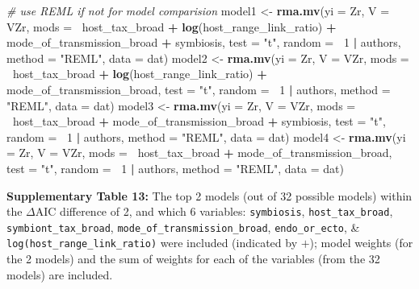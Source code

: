 \documentclass[
]{article}
\newenvironment{Shaded}{\begin{snugshade}}{\end{snugshade}}
\newcommand{\CommentTok}[1]{\textcolor[rgb]{0.56,0.35,0.01}{\textit{#1}}}
\newcommand{\DataTypeTok}[1]{\textcolor[rgb]{0.13,0.29,0.53}{#1}}
\newcommand{\DecValTok}[1]{\textcolor[rgb]{0.00,0.00,0.81}{#1}}
\newcommand{\KeywordTok}[1]{\textcolor[rgb]{0.13,0.29,0.53}{\textbf{#1}}}
\newcommand{\NormalTok}[1]{#1}
\newcommand{\OperatorTok}[1]{\textcolor[rgb]{0.81,0.36,0.00}{\textbf{#1}}}
\newcommand{\StringTok}[1]{\textcolor[rgb]{0.31,0.60,0.02}{#1}}
\begin{document}
\begin{Shaded}
\begin{Highlighting}[]
\CommentTok{# use REML if not for model comparision}
\NormalTok{model1 <-}\StringTok{ }\KeywordTok{rma.mv}\NormalTok{(}\DataTypeTok{yi =}\NormalTok{ Zr, }\DataTypeTok{V =}\NormalTok{ VZr, }\DataTypeTok{mods =} \OperatorTok{~}\NormalTok{host_tax_broad }\OperatorTok{+}\StringTok{ }\KeywordTok{log}\NormalTok{(host_range_link_ratio) }\OperatorTok{+}\StringTok{ }
\StringTok{    }\NormalTok{mode_of_transmission_broad }\OperatorTok{+}\StringTok{ }\NormalTok{symbiosis, }\DataTypeTok{test =} \StringTok{"t"}\NormalTok{, }\DataTypeTok{random =} \OperatorTok{~}\DecValTok{1} \OperatorTok{|}\StringTok{ }\NormalTok{authors, }\DataTypeTok{method =} \StringTok{"REML"}\NormalTok{, }
    \DataTypeTok{data =}\NormalTok{ dat)}
\NormalTok{model2 <-}\StringTok{ }\KeywordTok{rma.mv}\NormalTok{(}\DataTypeTok{yi =}\NormalTok{ Zr, }\DataTypeTok{V =}\NormalTok{ VZr, }\DataTypeTok{mods =} \OperatorTok{~}\NormalTok{host_tax_broad }\OperatorTok{+}\StringTok{ }\KeywordTok{log}\NormalTok{(host_range_link_ratio) }\OperatorTok{+}\StringTok{ }
\StringTok{    }\NormalTok{mode_of_transmission_broad, }\DataTypeTok{test =} \StringTok{"t"}\NormalTok{, }\DataTypeTok{random =} \OperatorTok{~}\DecValTok{1} \OperatorTok{|}\StringTok{ }\NormalTok{authors, }\DataTypeTok{method =} \StringTok{"REML"}\NormalTok{, }
    \DataTypeTok{data =}\NormalTok{ dat)}
\NormalTok{model3 <-}\StringTok{ }\KeywordTok{rma.mv}\NormalTok{(}\DataTypeTok{yi =}\NormalTok{ Zr, }\DataTypeTok{V =}\NormalTok{ VZr, }\DataTypeTok{mods =} \OperatorTok{~}\NormalTok{host_tax_broad }\OperatorTok{+}\StringTok{ }\NormalTok{mode_of_transmission_broad }\OperatorTok{+}\StringTok{ }
\StringTok{    }\NormalTok{symbiosis, }\DataTypeTok{test =} \StringTok{"t"}\NormalTok{, }\DataTypeTok{random =} \OperatorTok{~}\DecValTok{1} \OperatorTok{|}\StringTok{ }\NormalTok{authors, }\DataTypeTok{method =} \StringTok{"REML"}\NormalTok{, }\DataTypeTok{data =}\NormalTok{ dat)}
\NormalTok{model4 <-}\StringTok{ }\KeywordTok{rma.mv}\NormalTok{(}\DataTypeTok{yi =}\NormalTok{ Zr, }\DataTypeTok{V =}\NormalTok{ VZr, }\DataTypeTok{mods =} \OperatorTok{~}\NormalTok{host_tax_broad }\OperatorTok{+}\StringTok{ }\NormalTok{mode_of_transmission_broad, }
    \DataTypeTok{test =} \StringTok{"t"}\NormalTok{, }\DataTypeTok{random =} \OperatorTok{~}\DecValTok{1} \OperatorTok{|}\StringTok{ }\NormalTok{authors, }\DataTypeTok{method =} \StringTok{"REML"}\NormalTok{, }\DataTypeTok{data =}\NormalTok{ dat)}
\end{Highlighting}
\end{Shaded}

\textbf{Supplementary Table 13:} The top 2 models (out of 32 possible
models) within the \(\Delta\)AIC difference of 2, and which 6 variables:
\texttt{symbiosis}, \texttt{host\_tax\_broad},
\texttt{symbiont\_tax\_broad}, \texttt{mode\_of\_transmission\_broad},
\texttt{endo\_or\_ecto}, \& \texttt{log(host\_range\_link\_ratio)} were
included (indicated by \(+\)); model weights (for the 2 models) and the
sum of weights for each of the variables (from the 32 models) are
included.
\end{document}
